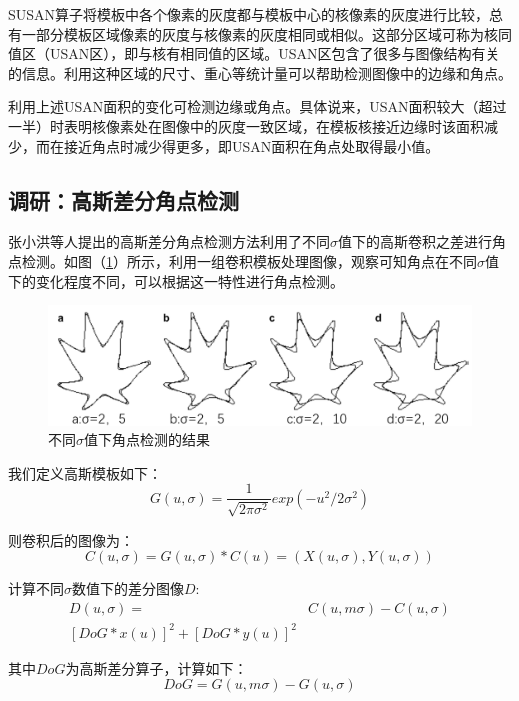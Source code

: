 \documentclass[a4paper,11pt,UTF8]{ctexart}
\begin{document}
SUSAN算子将模板中各个像素的灰度都与模板中心的核像素的灰度进行比较，总有一部分模板区域像素的灰度与核像素的灰度相同或相似。这部分区域可称为核同值区（USAN区），即与核有相同值的区域。USAN区包含了很多与图像结构有关的信息。利用这种区域的尺寸、重心等统计量可以帮助检测图像中的边缘和角点。

利用上述USAN面积的变化可检测边缘或角点。具体说来，USAN面积较大（超过一半）时表明核像素处在图像中的灰度一致区域，在模板核接近边缘时该面积减少，而在接近角点时减少得更多，即USAN面积在角点处取得最小值。

\subsection{调研：高斯差分角点检测}

张小洪等人提出的\cite{1}高斯差分角点检测方法利用了不同$\sigma$值下的高斯卷积之差进行角点检测。如图（\ref{sigma}）所示，利用一组卷积模板处理图像，观察可知角点在不同$\sigma$值下的变化程度不同，可以根据这一特性进行角点检测。
\begin {figure}[h]
\centering %
\includegraphics[width=\textwidth]{sigma.png}
\caption{不同$\sigma$值下角点检测的结果} %
\label{sigma}
\end {figure}

我们定义高斯模板如下：
\begin{equation}
  G(u,\sigma) = \frac{1}{\sqrt{2\pi \sigma^2}}exp(-u^2/2\sigma^2)
\end{equation}

则卷积后的图像为：
\begin{equation}
  C(u,\sigma) =G(u,\sigma)*C(u) = (X(u,\sigma),Y(u,\sigma))
\end{equation}

计算不同$\sigma$数值下的差分图像$D$:
\begin{align}
  D(u,\sigma) =& C(u,m\sigma)-C(u,\sigma)\\
  [DoG*x(u)]^2+[DoG*y(u)]^2
\end{align}

其中$DoG$为高斯差分算子，计算如下：
\begin{equation}
  DoG = G(u,m\sigma) - G(u,\sigma)
\end{equation}
\end{document}
